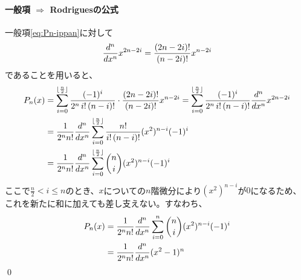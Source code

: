 \documentclass[../main/main]{subfiles}
\begin{document}
\paragraph{一般項 $\Longrightarrow$ Rodriguesの公式}
一般項\eqref{eq:Pn-ippan}に対して
\begin{equation*}
  {\frac{d^{n}}{dx^{n}}} x^{2n-2i} = \frac{(2n-2i)!}{(n-2i)!}x^{n-2i}
\end{equation*}
であることを用いると、
\begin{align*}
  P_n(x) &= \sum_{i=0}^{\lfloor \frac{n}{2} \rfloor} \frac{(-1)^i }{2^n\,  i!\, (n-i)!} \cdot 
		\frac{(2n-2i)!}{(n-2i)!}x^{n-2i}
	= \sum_{i=0}^{\lfloor \frac{n}{2} \rfloor} \frac{(-1)^i }{2^n\,  i!\, (n-i)!} {\frac{d^{n}}{dx^{n}}} x^{2n-2i} \notag\\
	&= \frac{1}{2^n n!} {\frac{d^{n}}{dx^{n}}} \sum_{i=0}^{\lfloor \frac{n}{2} \rfloor} \frac{n!}{i!\, (n-i)!} (x^2)^{n-i} (-1)^i
		\notag\\
	&= \frac{1}{2^n n!} {\frac{d^{n}}{dx^{n}}} \sum_{i=0}^{\lfloor \frac{n}{2} \rfloor} \binom{n}{i} (x^2)^{n-i} (-1)^i
\end{align*}
ここで$\frac{n}{2} < i \leq n$のとき、$x$についての$n$階微分により$(x^2)^{n-i}$が$0$になるため、
これを新たに和に加えても差し支えない。すなわち、
\begin{align*}
  P_n(x) &=  \frac{1}{2^n n!} {\frac{d^{n}}{dx^{n}}} \sum_{i=0}^{n} \binom{n}{i} (x^2)^{n-i} (-1)^i \notag\\
	&= \frac{1}{2^n n!} {\frac{d^{n}}{dx^{n}}} (x^2-1)^n
\end{align*}\qed
\end{document}
